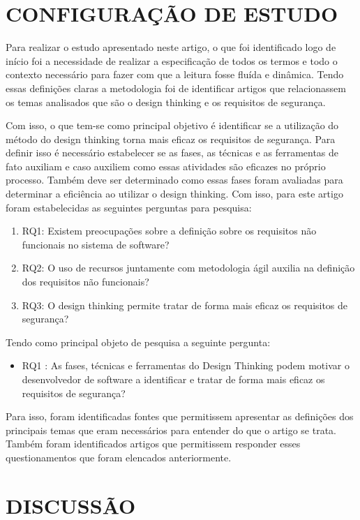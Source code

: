 \documentclass[a4paper,twoside]{article}
\begin{document}
\section{\uppercase{Configuração de Estudo}}


Para realizar o estudo apresentado neste artigo, o que foi identificado logo de início foi a necessidade de realizar a especificação de todos os termos e todo o contexto necessário para fazer com que a leitura fosse fluída e dinâmica. Tendo essas definições claras a metodologia foi de identificar artigos que relacionassem os temas analisados que são o design thinking e os requisitos de segurança.

Com isso, o que tem-se como principal objetivo é identificar se a utilização do método do design thinking torna mais eficaz os requisitos de segurança. Para definir isso é necessário estabelecer se as fases, as técnicas e as ferramentas de fato auxiliam e caso auxiliem como essas atividades são eficazes no próprio processo. Também deve ser determinado como essas fases foram avaliadas para determinar a eficiência ao utilizar o design thinking. Com isso, para este artigo foram estabelecidas as seguintes perguntas para pesquisa:
\begin{enumerate}
    \item RQ1: Existem preocupações sobre a definição sobre os requisitos não funcionais no sistema de software?
    \item RQ2: O uso de recursos juntamente com  metodologia ágil auxilia na definição dos requisitos não funcionais?
    \item RQ3: O design thinking permite tratar de forma mais eficaz os requisitos de segurança?
\end{enumerate}

Tendo como principal objeto de pesquisa a seguinte pergunta:
\begin{itemize}
    \item RQ1 : As fases, técnicas e ferramentas do Design Thinking podem motivar o desenvolvedor de software a identificar e tratar de forma mais eficaz os requisitos de segurança?
\end{itemize}

Para isso, foram identificadas fontes que permitissem apresentar as definições dos principais temas que eram necessários para entender do que o artigo se trata. Também foram identificados  artigos que permitissem responder esses questionamentos que foram elencados anteriormente.

\section{\uppercase{Discussão}}
\end{document}
